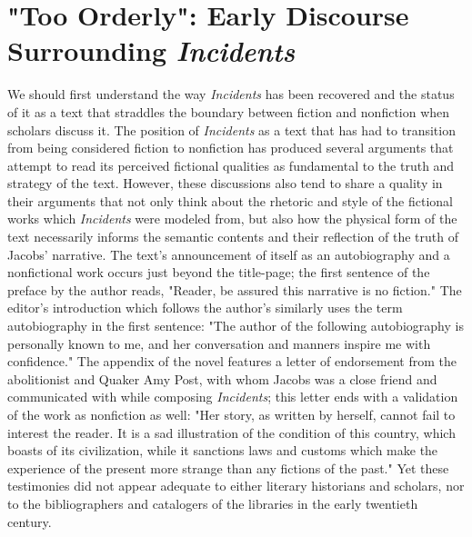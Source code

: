 \section{"Too Orderly": Early Discourse Surrounding \textit{Incidents}}
We should first understand the way \textit{Incidents} has been recovered and the status of it as a text that straddles the boundary between fiction and nonfiction when scholars discuss it. The position of \textit{Incidents} as a text that has had to transition from being considered fiction to nonfiction has produced several arguments that attempt to read its perceived fictional qualities as fundamental to the truth and strategy of the text. However, these discussions also tend to share a quality in their arguments that not only think about the rhetoric and style of the fictional works which \textit{Incidents} were modeled from, but also how the physical form of the text necessarily informs the semantic contents and their reflection of the truth of Jacobs' narrative. The text's announcement of itself as an autobiography and a nonfictional work occurs just beyond the title-page; the first sentence of the preface by the author reads, "Reader, be assured this narrative is no fiction."\autocite[5]{linda_brent_harriet_jacobs_incidents_1861} The editor's introduction which follows the author's similarly uses the term autobiography in the first sentence: "The author of the following autobiography is personally known to me, and her conversation and manners inspire me with confidence."\autocite[7]{linda_brent_harriet_jacobs_incidents_1861} The appendix of the novel features a letter of endorsement from the abolitionist and Quaker Amy Post, with whom Jacobs was a close friend and communicated with while composing \textit{Incidents}; this letter ends with a validation of the work as nonfiction as well: "Her story, as written by herself, cannot fail to interest the reader. It is a sad illustration of the condition of this country, which boasts of its civilization, while it sanctions laws and customs which make the experience of the present more strange than any fictions of the past."\autocite[305]{linda_brent_harriet_jacobs_incidents_1861} Yet these testimonies did not appear adequate to either literary historians and scholars, nor to the bibliographers and catalogers of the libraries in the early twentieth century.  

